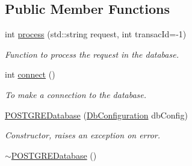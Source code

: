 \subsection*{Public Member Functions}
\begin{DoxyCompactItemize}
\item 
int \hyperlink{classPOSTGREDatabase_a6d987fa60e08c3041a6aee5c06e108dd}{process} (std::string request, int transacId=-\/1)
\begin{DoxyCompactList}\small\item\em Function to process the request in the database. \item\end{DoxyCompactList}\item 
int \hyperlink{classPOSTGREDatabase_a758b0d66ddda58296932242533000846}{connect} ()
\begin{DoxyCompactList}\small\item\em To make a connection to the database. \item\end{DoxyCompactList}\item 
\hypertarget{classPOSTGREDatabase_a6247c279cf30239d6685a71fdab706b9}{
\hyperlink{classPOSTGREDatabase_a6247c279cf30239d6685a71fdab706b9}{POSTGREDatabase} (\hyperlink{classDbConfiguration}{DbConfiguration} dbConfig)}
\label{classPOSTGREDatabase_a6247c279cf30239d6685a71fdab706b9}

\begin{DoxyCompactList}\small\item\em Constructor, raises an exception on error. \item\end{DoxyCompactList}\item 
\hypertarget{classPOSTGREDatabase_a455249ba891bb36b51ea2fb67f5043bf}{
\hyperlink{classPOSTGREDatabase_a455249ba891bb36b51ea2fb67f5043bf}{$\sim$POSTGREDatabase} ()}
\label{classPOSTGREDatabase_a455249ba891bb36b51ea2fb67f5043bf}


\end{DoxyCompactItemize}
